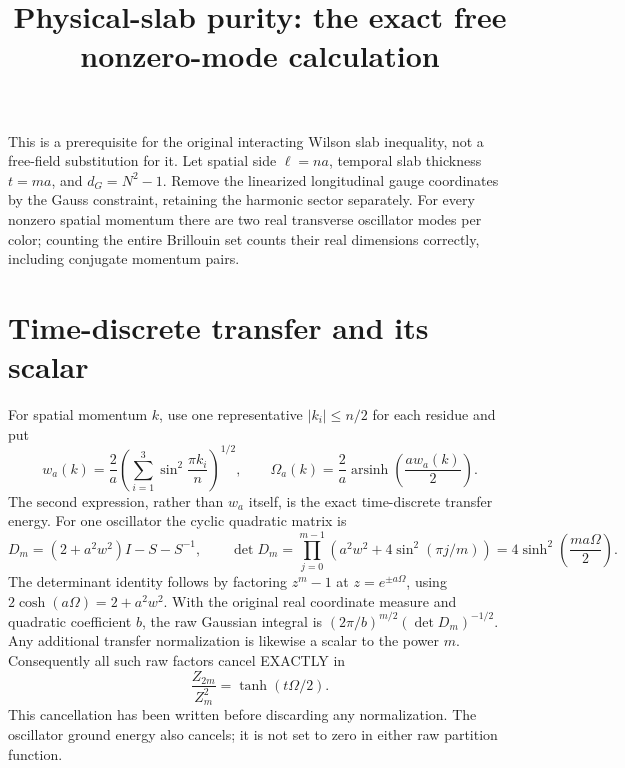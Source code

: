 \documentclass{article}
\title{Physical-slab purity: the exact free nonzero-mode calculation}\author{}\date{}
\begin{document}
\maketitle
This is a prerequisite for the original interacting Wilson slab inequality, not a free-field substitution for it. Let spatial side $\ell=na$, temporal slab thickness $t=ma$, and $d_G=N^2-1$. Remove the linearized longitudinal gauge coordinates by the Gauss constraint, retaining the harmonic sector separately. For every nonzero spatial momentum there are two real transverse oscillator modes per color; counting the entire Brillouin set counts their real dimensions correctly, including conjugate momentum pairs.

\section*{Time-discrete transfer and its scalar}
For spatial momentum $k$, use one representative $|k_i|\le n/2$ for each residue and put
\[
 w_a(k)=\frac2a\left(\sum_{i=1}^3\sin^2\frac{\pi k_i}{n}\right)^{1/2},\qquad
 \Omega_a(k)=\frac2a\operatorname{arsinh}\left(\frac{a w_a(k)}2\right).
\]
The second expression, rather than $w_a$ itself, is the exact time-discrete transfer energy. For one oscillator the cyclic quadratic matrix is
\[
 D_m=(2+a^2w^2)I-S-S^{-1},\qquad
 \det D_m=\prod_{j=0}^{m-1}(a^2w^2+4\sin^2(\pi j/m))
 =4\sinh^2\!\left(\frac{ma\Omega}2\right).
\]
The determinant identity follows by factoring $z^m-1$ at $z=e^{\pm a\Omega}$, using $2\cosh(a\Omega)=2+a^2w^2$. With the original real coordinate measure and quadratic coefficient $b$, the raw Gaussian integral is $(2\pi/b)^{m/2}(\det D_m)^{-1/2}$. Any additional transfer normalization is likewise a scalar to the power $m$. Consequently all such raw factors cancel EXACTLY in
\[
 \frac{Z_{2m}}{Z_m^2}=\tanh(t\Omega/2).
\]
This cancellation has been written before discarding any normalization. The oscillator ground energy also cancels; it is not set to zero in either raw partition function.
\end{document}
